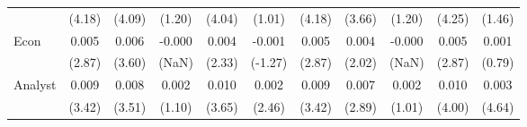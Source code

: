 \begin{table}[H]
{\begin{tabular}{lcccccccccc}
   & (4.18) & (4.09) & (1.20) & (4.04) & (1.01) & (4.18) & (3.66) & (1.20) & (4.25) & (1.46) \\ 
  Econ & 0.005 & 0.006 & -0.000 & 0.004 & -0.001 & 0.005 & 0.004 & -0.000 & 0.005 & 0.001 \\ 
   & (2.87) & (3.60) & (NaN) & (2.33) & (-1.27) & (2.87) & (2.02) & (NaN) & (2.87) & (0.79) \\ 
  Analyst & 0.009 & 0.008 & 0.002 & 0.010 & 0.002 & 0.009 & 0.007 & 0.002 & 0.010 & 0.003 \\ 
   & (3.42) & (3.51) & (1.10) & (3.65) & (2.46) & (3.42) & (2.89) & (1.01) & (4.00) & (4.64) \\ 
   \hline 
\end{tabular}
}
\end{table}
